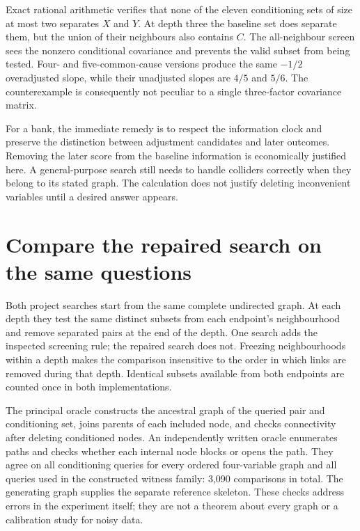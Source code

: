 Exact rational arithmetic verifies that none of the eleven conditioning sets
of size at most two separates $X$ and $Y$. At depth three the baseline set
does separate them, but the union of their neighbours also contains $C$.
The all-neighbour screen sees the nonzero conditional covariance and prevents
the valid subset from being tested. Four- and five-common-cause versions
produce the same $-1/2$ overadjusted slope, while their unadjusted slopes are
$4/5$ and $5/6$. The counterexample is consequently not peculiar to a single
three-factor covariance matrix.

For a bank, the immediate remedy is to respect the information clock and
preserve the distinction between adjustment candidates and later outcomes.
Removing the later score from the baseline information is economically
justified here. A general-purpose search still needs to handle colliders
correctly when they belong to its stated graph. The calculation does not
justify deleting inconvenient variables until a desired answer appears.

\section{Compare the repaired search on the same questions}

Both project searches start from the same complete undirected graph. At
each depth they test the same distinct subsets from each endpoint's
neighbourhood and remove separated pairs at the end of the depth. One search
adds the inspected screening rule; the repaired search does not. Freezing
neighbourhoods within a depth makes the comparison insensitive to the order
in which links are removed during that depth. Identical subsets available
from both endpoints are counted once in both implementations.

The principal oracle constructs the ancestral graph of the queried pair
and conditioning set, joins parents of each included node, and checks
connectivity after deleting conditioned nodes. An independently written
oracle enumerates paths and checks whether each internal node blocks or
opens the path. They agree on all conditioning queries for every ordered
four-variable graph and all queries used in the constructed witness family:
3,090 comparisons in total. The generating graph supplies the separate
reference skeleton. These checks address errors in the experiment itself;
they are not a theorem about every graph or a calibration study for noisy data.

